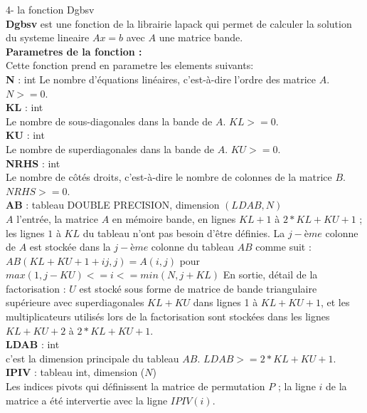 \documentclass[12pt]{report}
\begin{document}
4- la fonction Dgbsv\\

\textbf{Dgbsv} est une fonction de la librairie lapack qui permet de calculer la solution du systeme lineaire $Ax=b$ avec $A$ une matrice bande.\\

\textbf{Parametres de la fonction :}\\

Cette fonction prend en parametre les elements suivants:\\

\textbf{N} : int
Le nombre d'équations linéaires, c'est-à-dire l'ordre des
matrice $A$. $N >= 0$.\\

\textbf{KL} : int\\
Le nombre de sous-diagonales dans la bande de $A$. $KL >= 0$.\\

\textbf{KU} : int\\
Le nombre de superdiagonales dans la bande de $A$. $KU >= 0$.\\

\textbf{NRHS} : int\\
Le nombre de côtés droits, c'est-à-dire le nombre de colonnes
de la matrice $B$. $NRHS >= 0$.\\

\textbf{AB} : tableau DOUBLE PRECISION, dimension $(LDAB,N)$\\

$A$ l'entrée, la matrice $A$ en mémoire bande, en lignes $KL+1$ à $2*KL+KU+1$ ; les lignes $1$ à $KL$ du tableau n'ont pas besoin d'être définies.
La $j-ème$ colonne de $A$ est stockée dans la $j-ème$ colonne du tableau $AB$ comme suit :
$AB(KL+KU+1+ij,j) = A(i,j)$ pour $max(1,j-KU)<=i<=min(N,j+KL)$ En sortie, détail de la factorisation : $U$ est stocké sous forme de matrice de bande triangulaire supérieure avec superdiagonales $KL+KU$ dans lignes 1 à $KL+KU+1$, et les multiplicateurs utilisés lors de la factorisation sont stockées dans les lignes $KL+KU+2$ à $2*KL+KU+1$.\\

\textbf{LDAB} : int\\
c'est la dimension principale du tableau $AB$. $LDAB >= 2*KL+KU+1$.\\

\textbf{IPIV} : tableau int, dimension ($N$)\\

Les indices pivots qui définissent la matrice de permutation $P$ ;
la ligne $i$ de la matrice a été intervertie avec la ligne $IPIV(i)$.\\
\end{document}
